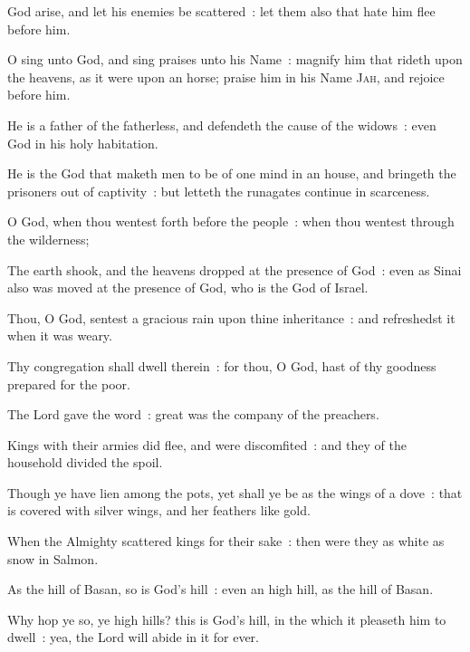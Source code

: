  God arise, and let his enemies be scattered~: let them also that hate him flee before him.\par
{}
O sing unto God, and sing praises unto his Name~: magnify him that rideth upon the heavens, as it were upon an horse; praise him in his Name \textsc{Jah}, and rejoice before him.\par
{}He is a father of the fatherless, and defendeth the cause of the widows~: even God in his holy habitation.\par
{}He is the God that maketh men to be of one mind in an house, and bringeth the prisoners out of captivity~: but letteth the runagates continue in scarceness.\par
{}O God, when thou wentest forth before the people~: when thou wentest through the wilderness;\par
{}The earth shook, and the heavens dropped at the presence of God~: even as Sinai also was moved at the presence of God, who is the God of Israel.\par
{}Thou, O God, sentest a gracious rain upon thine inheritance~: and refreshedst it when it was weary.\par
{}Thy congregation shall dwell therein~: for thou, O God, hast of thy goodness prepared for the poor.\par
{}The Lord gave the word~: great was the company of the preachers.\par
{}Kings with their armies did flee, and were discomfited~: and they of the household divided the spoil.\par
{}Though ye have lien among the pots, yet shall ye be as the wings of a dove~: that is covered with silver wings, and her feathers like gold.\par
{}When the Almighty scattered kings for their sake~: then were they as white as snow in Salmon.\par
{}As the hill of Basan, so is God's hill~: even an high hill, as the hill of Basan.\par
{}Why hop ye so, ye high hills? this is God's hill, in the which it pleaseth him to dwell~: yea, the Lord will abide in it for ever.\par
